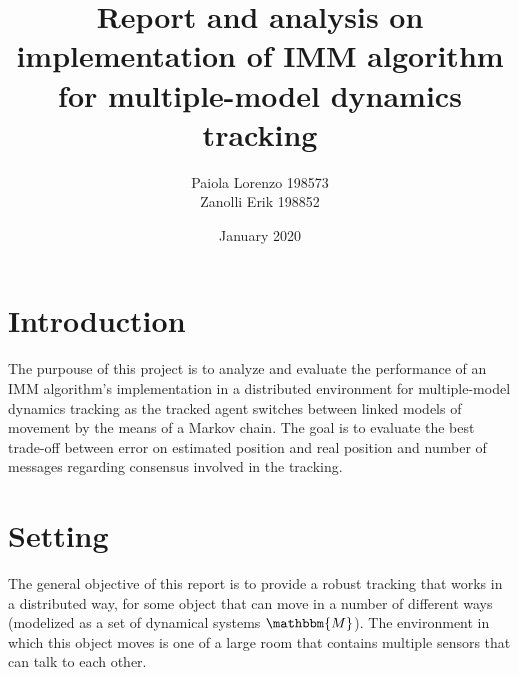 \documentclass[twocolumn]{article}
\title{Report and analysis on implementation of IMM algorithm for multiple-model dynamics tracking}
\author{
Paiola Lorenzo 198573 

Zanolli Erik 198852}
\date{January 2020}
\begin{document}
\maketitle



\section*{Introduction}
\justify
The purpouse of this project is to analyze and evaluate the performance of an IMM algorithm's implementation in a distributed environment for
multiple-model dynamics tracking as the tracked agent switches between linked models of movement by the means of a Markov chain. The goal 
is to evaluate the best trade-off between error on estimated position and real position and number of messages regarding consensus involved in the tracking.


    \section*{Setting}
    \justify
    The general objective of this report is to provide a robust tracking that works in a distributed way, for some object that can move 
    in a number of different ways (modelized as a set of dynamical systems $\mathbbm{M}$). The environment in which this object moves is 
    one of a large room that contains multiple sensors that can talk to each other.
    \\
\end{document}
